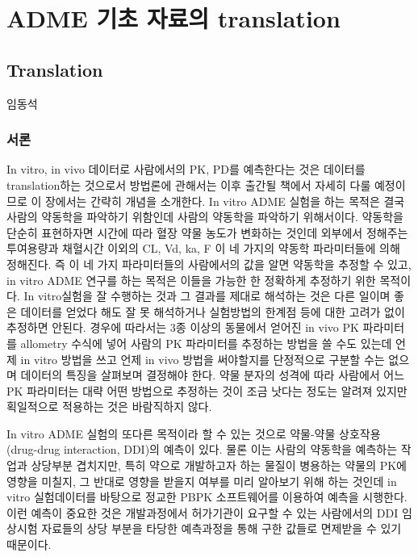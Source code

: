 \documentclass[
  11pt,
  krantz2, a4paper, twoside]{krantz}
\begin{document}
\hypertarget{part-adme-uxae30uxcd08-uxc790uxb8ccuxc758-translation}{%
\part{ADME 기초 자료의 translation}\label{part-adme-uxae30uxcd08-uxc790uxb8ccuxc758-translation}}

\hypertarget{translation}{%
\chapter{Translation}\label{translation}}

\Large\hfill

임동석
\normalsize

\hypertarget{uxc11cuxb860-7}{%
\section{서론}\label{uxc11cuxb860-7}}

In vitro, in vivo 데이터로 사람에서의 PK, PD를 예측한다는 것은 데이터를 translation하는 것으로서 방법론에 관해서는 이후 출간될 책에서 자세히 다룰 예정이므로 이 장에서는 간략히 개념을 소개한다.
In vitro ADME 실험을 하는 목적은 결국 사람의 약동학을 파악하기 위함인데 사람의 약동학을 파악하기 위해서이다.
약동학을 단순히 표현하자면 시간에 따라 혈장 약물 농도가 변화하는 것인데 외부에서 정해주는 투여용량과 채혈시간 이외의 CL, Vd, ka, F 이 네 가지의 약동학 파라미터들에 의해 정해진다.
즉 이 네 가지 파라미터들의 사람에서의 값을 알면 약동학을 추정할 수 있고, in vitro ADME 연구를 하는 목적은 이들을 가능한 한 정확하게 추정하기 위한 목적이다.
In vitro실험을 잘 수행하는 것과 그 결과를 제대로 해석하는 것은 다른 일이며 좋은 데이터를 얻었다 해도 잘 못 해석하거나 실험방법의 한계점 등에 대한 고려가 없이 추정하면 안된다.
경우에 따라서는 3종 이상의 동물에서 얻어진 in vivo PK 파라미터를 allometry 수식에 넣어 사람의 PK 파라미터를 추정하는 방법을 쓸 수도 있는데 언제 in vitro 방법을 쓰고 언제 in vivo 방법을 써야할지를 단정적으로 구분할 수는 없으며 데이터의 특징을 살펴보며 결정해야 한다.
약물 분자의 성격에 따라 사람에서 어느 PK 파라미터는 대략 어떤 방법으로 추정하는 것이 조금 낫다는 정도는 알려져 있지만 획일적으로 적용하는 것은 바람직하지 않다.

In vitro ADME 실험의 또다른 목적이라 할 수 있는 것으로 약물-약물 상호작용 (drug-drug interaction, DDI)의 예측이 있다.
물론 이는 사람의 약동학을 예측하는 작업과 상당부분 겹치지만, 특히 약으로 개발하고자 하는 물질이 병용하는 약물의 PK에 영향을 미칠지, 그 반대로 영향을 받을지 여부를 미리 알아보기 위해 하는 것인데 in vitro 실험데이터를 바탕으로 정교한 PBPK 소프트웨어를 이용하여 예측을 시행한다.
이런 예측이 중요한 것은 개발과정에서 허가기관이 요구할 수 있는 사람에서의 DDI 임상시험 자료들의 상당 부분을 타당한 예측과정을 통해 구한 값들로 면제받을 수 있기 때문이다.
\end{document}
